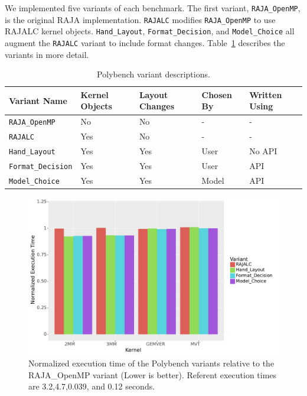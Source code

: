 \documentclass[sigconf,review=true]{acmart}
\begin{document}
We implemented five variants of each benchmark.
The first variant, \verb.RAJA_OpenMP., is the original RAJA implementation.
\verb.RAJALC. modifies \verb.RAJA_OpenMP. to use RAJALC kernel objects.
\verb.Hand_Layout., \verb.Format_Decision., and \verb.Model_Choice. all augment the \verb.RAJALC. variant to include format changes.
Table~\ref{VariantDescription} describes the variants in more detail.

\begin{table}
	\centering
	\begin{tabular}{ p{2.4cm} | p{1.1cm} | p{1.1cm} | p{1cm} | p{1cm}}
		 \raggedright Variant \linebreak Name & \raggedright Kernel Objects & \raggedright Layout Changes & \raggedright Chosen By &  Written Using \tabularnewline
		\hline
		\verb.RAJA_OpenMP. & No & No & - & - \\
		\verb.RAJALC. & Yes & No & - & - \\
		\verb.Hand_Layout. & Yes & Yes & User & No API \\
		\verb.Format_Decision. & Yes & Yes & User & API \\
		\verb.Model_Choice. & Yes & Yes & Model & API
	\end{tabular}
	\caption{Polybench variant descriptions.}
	\label{VariantDescription}
\end{table}

\begin{figure}
	\includegraphics[width=\columnwidth]{PolybenchPerfPlot.pdf}
	\caption{Normalized execution time of the Polybench variants relative to the RAJA\_OpenMP variant (Lower is better). Referent execution times are 3.2,4.7,0.039, and 0.12 seconds.}
	\label{PolybenchPerformance}
\end{figure}
\end{document}
